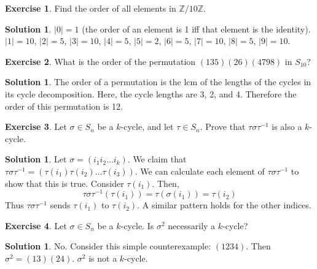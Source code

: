 \documentclass[12pt]{article}
\theoremstyle{definition}
\newtheorem{exercise}{Exercise}
\theoremstyle{definition}
\newtheorem{solution}[theorem]{Solution}
\newcommand{\Z}{\mathbb{Z}}
\begin{document}
\begin{exercise}
Find the order of all elements in $\Z / 10 \Z$.
\end{exercise}
\begin{solution}
$|0| = 1$ (the order of an element is 1 iff that element is the identity). $|1| = 10$, $|2| = 5$, $|3| = 10$, $|4| = 5$, $|5|=2$, $|6| = 5$, $|7|=10$, $|8|=5$, $|9|=10$.
\end{solution}

\begin{exercise}
What is the order of the permutation $(1 3 5)(2 6)(4 7 9 8)$ in $S_{10}$?
\end{exercise}
\begin{solution}
The order of a permutation is the lcm of the lengths of the cycles in its cycle decomposition. Here, the cycle lengths are 3, 2, and 4. Therefore the order of this permutation is 12.
\end{solution}

\begin{exercise}
Let $\sigma \in S_n$ be a $k$-cycle, and let $\tau \in S_n$. Prove that $\tau \sigma \tau^{-1}$ is also a $k$-cycle.
\end{exercise}
\begin{solution}
Let $\sigma = (i_1 i_2 \ldots i_k)$. We claim that $\tau \sigma \tau^{-1} = (\tau(i_1) \tau(i_2) \ldots \tau(i_3))$. We can calculate each element of $\tau \sigma \tau^{-1}$ to show that this is true. Consider $\tau(i_1)$. Then,
\begin{equation}
	\tau \sigma \tau^{-1}(\tau(i_1)) = \tau(\sigma(i_1)) = \tau(i_2)
\end{equation}
Thus $\tau \sigma \tau^{-1}$ sends $\tau(i_1)$ to $\tau(i_2)$. A similar pattern holds for the other indices. 
\end{solution}

\begin{exercise}
Let $\sigma \in S_n$ be a $k$-cycle. Is $\sigma^2$ necessarily a $k$-cycle?
\end{exercise}
\begin{solution}
No. Consider this simple counterexample: $(1 2 3 4)$. Then $\sigma^2 = (1 3) (2 4)$. $\sigma^2$ is not a $k$-cycle.
\end{solution}
\end{document}
